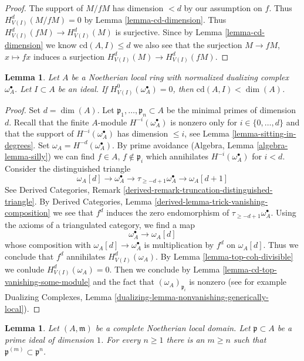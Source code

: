 \documentclass{stacks-project}
\theoremstyle{plain}
\newtheorem{lemma}[subsection]{Lemma}
\theoremstyle{definition}
\theoremstyle{remark}
\numberwithin{equation}{subsection}
\begin{document}
\begin{proof}
The support of $M/fM$ has dimension $< d$ by our assumption on $f$.
Thus $H^d_{V(I)}(M/fM) = 0$ by Lemma \ref{lemma-cd-dimension}.
Thus $H^d_{V(I)}(fM) \to H^d_{V(I)}(M)$ is surjective.
Since by Lemma \ref{lemma-cd-dimension} we know $\text{cd}(A, I) \leq d$
we also see that the surjection $M \to fM$, $x \mapsto fx$
induces a surjection $H^d_{V(I)}(M) \to H^d_{V(I)}(fM)$.
\end{proof}

\begin{lemma}
\label{lemma-cd-bound-dualizing}
Let $A$ be a Noetherian local ring with
normalized dualizing complex $\omega_A^\bullet$.
Let $I \subset A$ be an ideal.
If $H^0_{V(I)}(\omega_A^\bullet) = 0$, then $\text{cd}(A, I) < \dim(A)$.
\end{lemma}

\begin{proof}
Set $d = \dim(A)$. Let $\mathfrak p_1, \ldots, \mathfrak p_n \subset A$
be the minimal primes of dimension $d$.
Recall that the finite $A$-module
$H^{-i}(\omega_A^\bullet)$ is nonzero only for
$i \in \{0, \ldots, d\}$ and that the support
of $H^{-i}(\omega_A^\bullet)$ has dimension $\leq i$, see
Lemma \ref{lemma-sitting-in-degrees}.
Set $\omega_A = H^{-d}(\omega_A^\bullet)$.
By prime avoidance (Algebra, Lemma \ref{algebra-lemma-silly})
we can find $f \in A$, $f \not \in \mathfrak p_i$
which annihilates $H^{-i}(\omega_A^\bullet)$ for $i < d$.
Consider the distinguished triangle
$$
\omega_A[d] \to \omega_A^\bullet \to
\tau_{\geq -d + 1}\omega_A^\bullet \to \omega_A[d + 1]
$$
See Derived Categories, Remark
\ref{derived-remark-truncation-distinguished-triangle}.
By Derived Categories, Lemma \ref{derived-lemma-trick-vanishing-composition}
we see that $f^d$ induces the zero endomorphism of
$\tau_{\geq -d + 1}\omega_A^\bullet$.
Using the axioms of a triangulated category, we find a map
$$
\omega_A^\bullet \to \omega_A[d]
$$
whose composition with $\omega_A[d] \to \omega_A^\bullet$ is
multiplication by $f^d$ on $\omega_A[d]$.
Thus we conclude that $f^d$ annihilates $H^d_{V(I)}(\omega_A)$.
By Lemma \ref{lemma-top-coh-divisible} we conlude $H^d_{V(I)}(\omega_A) = 0$.
Then we conclude by Lemma \ref{lemma-cd-top-vanishing-some-module}
and the fact that $(\omega_A)_{\mathfrak p_i}$ is nonzero
(see for example
Dualizing Complexes, Lemma
\ref{dualizing-lemma-nonvanishing-generically-local}).
\end{proof}

\begin{lemma}
\label{lemma-inverse-system-symbolic-powers}
Let $(A, \mathfrak m)$ be a complete Noetherian local domain. Let
$\mathfrak p \subset A$ be a prime ideal of dimension $1$.
For every $n \geq 1$ there is an $m \geq n$ such that
$\mathfrak p^{(m)} \subset \mathfrak p^n$.
\end{lemma}
\end{document}

